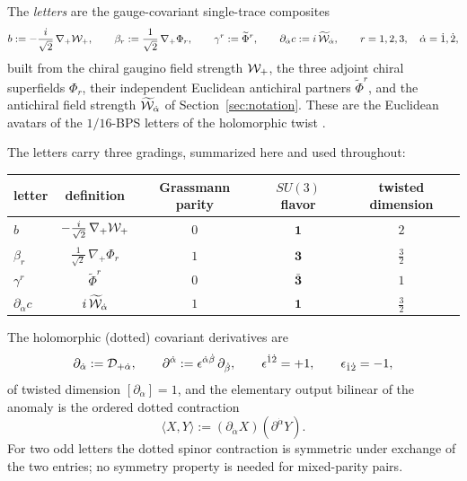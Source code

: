 \begin{definition}\label{def:ss:letters}
The \emph{letters} are the gauge-covariant single-trace composites
\begin{equation}\label{eq:ss:letters}
b := -\frac{i}{\sqrt2}\,\nabla_{+}\mathcal{W}_{+},
\qquad
\beta_{r} := \frac{1}{\sqrt2}\,\nabla_{+}\Phi_{r},
\qquad
\gamma^{r} := \widetilde\Phi^{r},
\qquad
\partial_{\dot\alpha}c := i\,\widetilde{\mathcal{W}}_{\dot\alpha},
\qquad r=1,2,3,\quad \dot\alpha=\dot1,\dot2 ,
\end{equation}
built from the chiral gaugino field strength $\mathcal{W}_+$, the three adjoint chiral
superfields $\Phi_r$, their independent Euclidean antichiral partners
$\widetilde\Phi^r$, and the antichiral field strength $\widetilde{\mathcal{W}}_{\dot\alpha}$ of
Section~\ref{sec:notation}. These are the Euclidean avatars of the $1/16$-BPS
letters of the holomorphic twist \cite{BK}.
\end{definition}

The letters carry three gradings, summarized here and used throughout:
\begin{center}
\begin{tabular}{lcccc}
\hline
letter & definition & Grassmann parity & $SU(3)$ flavor & twisted dimension\\
\hline
$b$ & $-\frac{i}{\sqrt2}\,\nabla_+\mathcal{W}_+$ & $0$ & $\mathbf 1$ & $2$\\[2pt]
$\beta_r$ & $\frac{1}{\sqrt2}\,\nabla_+\Phi_r$ & $1$ & $\mathbf 3$ & $\tfrac32$\\[2pt]
$\gamma^r$ & $\widetilde\Phi^r$ & $0$ & $\bar{\mathbf 3}$ & $1$\\[2pt]
$\partial_{\dot\alpha}c$ & $i\,\widetilde{\mathcal{W}}_{\dot\alpha}$ & $1$ & $\mathbf 1$ & $\tfrac32$\\
\hline
\end{tabular}
\end{center}
The holomorphic (dotted) covariant derivatives are
\begin{equation}\label{eq:ss:dotted}
\partial_{\dot\alpha} := \mathcal{D}_{+\dot\alpha},
\qquad
\partial^{\dot\alpha} := \epsilon^{\dot\alpha\dot\beta}\,\partial_{\dot\beta},
\qquad
\epsilon^{\dot1\dot2}=+1,\qquad \epsilon_{\dot1\dot2}=-1 ,
\end{equation}
of twisted dimension $[\partial_{\dot\alpha}]=1$, and the elementary output
bilinear of the anomaly is the ordered dotted contraction
\begin{equation}\label{eq:ss:bilinear}
\langle X,Y\rangle := (\partial_{\dot\alpha}X)(\partial^{\dot\alpha}Y) .
\end{equation}
For two odd letters the dotted spinor contraction is symmetric under exchange
of the two entries; no symmetry property is needed for mixed-parity pairs.

